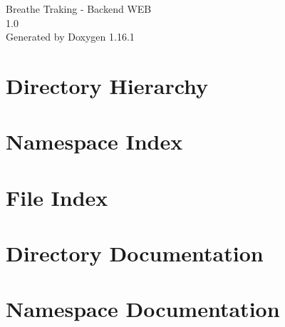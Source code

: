 \documentclass[twoside]{book}
\newcommand{\+}{\discretionary{\mbox{\scriptsize$\hookleftarrow$}}{}{}}
\newcommand{\clearemptydoublepage}{%
    \newpage{\pagestyle{empty}\cleardoublepage}%
  }
\begin{document}
  \raggedbottom
    \hypersetup{pageanchor=false,
                bookmarksnumbered=true,
                pdfencoding=unicode
               }
  \begin{titlepage}
  \vspace*{7cm}
  \begin{center}%
  {\Large Breathe Traking -\/ Backend WEB}\\
  [1ex]\large 1.\+0 \\
  \vspace*{1cm}
  {\large Generated by Doxygen 1.16.1}\\
  \end{center}
  \end{titlepage}
  \clearemptydoublepage
  \tableofcontents
  \clearemptydoublepage
  \hypersetup{pageanchor=true}

\chapter{Directory Hierarchy}

\chapter{Namespace Index}

\chapter{File Index}

\chapter{Directory Documentation}




\chapter{Namespace Documentation}




\end{document}
